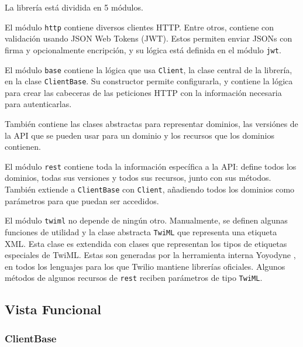 \documentclass{article}
\begin{document}
La librería está dividida en 5 módulos.

\hfill

El módulo \verb|http| contiene diversos clientes HTTP.
Entre otros, contiene con validación usando JSON Web Tokens (JWT).
Estos permiten enviar JSONs con firma y opcionalmente encripción,
y su lógica está definida en el módulo \verb|jwt|.

\hfill

El módulo \verb|base| contiene
la lógica que usa \verb|Client|,
la clase central de la librería,
en la clase \verb|ClientBase|.
Su constructor permite configurarla,
y contiene la lógica para 
crear las cabeceras de las peticiones HTTP
con la información necesaria para autenticarlas.

También contiene las clases abstractas
para representar dominios,
las versiónes de la API que se pueden usar para un dominio
y los recursos que los dominios contienen.

\hfill

El módulo \verb|rest|
contiene toda la información específica a la API:
define todos los dominios,
todas sus versiones y todos sus recursos,
junto con sus métodos.
También extiende a \verb|ClientBase| con \verb|Client|,
añadiendo todos los dominios como parámetros
para que puedan ser accedidos.

\hfill

El módulo \verb|twiml| no depende de ningún otro.
Manualmente, se definen algunas funciones de utilidad
y la clase abstracta \verb|TwiML|
que representa una etiqueta XML.
Esta clase es extendida
con clases que representan los tipos de etiquetas especiales de TwiML.
Estas son generadas por la herramienta interna Yoyodyne
\cite{twilio-generated-yoyodyne},
en todos los lenguajes para los que Twilio mantiene librerías oficiales.
Algunos métodos de algunos recursos de \verb|rest|
reciben parámetros de tipo \verb|TwiML|.

\subsection{Vista Funcional}

\subsubsection{ClientBase}

\hfill
\end{document}
